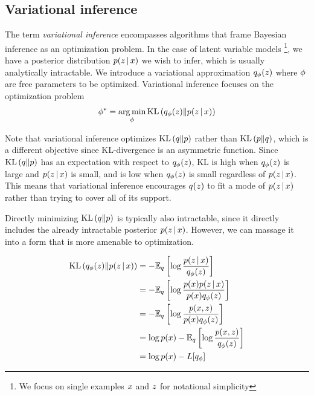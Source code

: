 \subsection{Variational inference}
The term \emph{variational inference}
encompasses algorithms
that frame Bayesian inference
as an optimization
problem. In the case
of latent variable models
\footnote{We focus on
single examples $x$ and $z$ for notational
simplicity},
we have a posterior distribution $p(z \,|\, x)$ we wish to
infer, which is
usually analytically intractable.
We introduce a variational approximation
$q_\phi(z)$ where $\phi$
are free parameters to be optimized.
Variational inference focuses on the 
optimization problem 
\begin{align*}
\phi^* = \operatorname*{arg\,min}_\phi \mathrm{KL}\left(q_\phi(z)\|p(z \,|\, x)\right)
\end{align*}

Note that variational inference optimizes $\mathrm{KL}\left(q\|p\right)$
rather than $\mathrm{KL}\left(p\|q\right)$, which is a different objective
since KL-divergence is an asymmetric function.
Since $\mathrm{KL}\left(q\|p\right)$ has an expectation with respect
to $q_\phi(z)$, KL
is high when $q_\phi(z)$ is large and $p(z \,|\, x)$ is
small, and is low when $q_\phi(z)$ is small
regardless of $p(z \,|\, x)$. This means that
variational inference encourages $q(z)$ to
fit a mode of $p(z \,|\, x)$ rather than trying to 
cover all of its support.

Directly minimizing $\mathrm{KL}\left(q\|p\right)$ is typically
also intractable, since it directly 
includes the already intractable posterior
$p(z \,|\, x)$. However, we can 
massage it into a form that is
more amenable to optimization.

\begin{align*}
    \mathrm{KL}\left(q_\phi(z)\|p(z \,|\, x)\right) &=  
    -\mathbb{E}_q \left[\log\frac{p(z \,|\, x)}{q_\phi(z)}\right] \\
    &= -\mathbb{E}_q\left[\log \frac{p(x)p(z \,|\, x)}{p(x)q_\phi(z)}\right] \\
    &= -\mathbb{E}_q\left[\log \frac{p(x, z)}{p(x)q_\phi(z)}\right] \\
    &= \log p(x) -\mathbb{E}_q\left[\log \frac{p(x, z)}{q_\phi(z)}\right] \\
    &= \log p(x) - L[q_\phi]
\end{align*}

